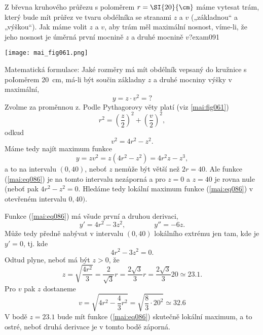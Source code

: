 \begin{mathexam}{Z břevna kruhového průřezu s poloměrem \(r = \protect\SI{20}{\protect\cm}\) máme
  vytesat trám, který bude mít průřez ve tvaru obdélníka se stranami \(z\) a \(v\) („základnou“ a
  „výškou“). Jak máme volit \(z\) a \(v\), aby trám měl maximální nosnost, víme-li, že jeho nosnost
  je úměrná první mocnině \(z\) a druhé mocnině \(v\)?}{exam091}
   
  {\centering
    \captionsetup{type=figure}
    \texttt{[image: mai\_fig061.png]} 
    \label{mai:fig061}
  \par}
  
  Matematická formulace: Jaké rozměry má mít obdélník vepsaný do kružnice s poIoměrem \SI{20}{\cm},
  má-li být součin základny \(z\) a druhé mocniny výšky v maximální,
  \begin{equation*}
    y = z\cdot v^2 = ?
  \end{equation*}
  Zvolme za proměnnou z. Podle Pythagorovy věty platí (viz \ref{mai:fig061})
  \begin{equation*}
      r^2 = \left(\dfrac{z}{2}\right)^2 + \left(\dfrac{v}{2}\right)^2,
  \end{equation*}
  odkud 
  \begin{equation*}
      v^2 = 4r^2 - z^2.
  \end{equation*}
  Máme tedy najít maximum funkce
  \begin{equation}\label{mai:eq086}
      y = zv^2 = z(4r^2 - z^2) = 4r^2z - z^3,
  \end{equation}
  a to na intervalu \((0,40)\), neboť \(z\) nemůže být větší než \(2r = 40\). Ale funkce
  (\ref{mai:eq086}) je na tomto intervalu nezáporná a pro \(z = 0\) a \(z = 40\) je rovna nule
  (neboť pak \(4r^2 - z^2 = 0\). Hledáme tedy lokální maximum funkce (\ref{mai:eq086}) v otevřeném
  intervalu \(0,40)\). 

  Funkce (\ref{mai:eq086}) má všude první a druhou derivaci,
  \begin{equation*}
      y' = 4r^2 - 3z^2, \qquad\qquad y'' = -6z.
  \end{equation*}
  Může tedy předně nabývat v intervalu \((0, 40)\) lokálního extrému jen tam, kde je \(y'=0\), tj.
  kde
  \begin{equation*}
      4r^2 - 3z^2 = 0.
  \end{equation*}
  Odtud plyne, neboť má být \(z > 0\), že
  \begin{equation*}
      z = \sqrt{\dfrac{4r^2}{3}} = \dfrac{2}{\sqrt{3}}r = \dfrac{2\sqrt{3}}{3}r = 
          \dfrac{2\sqrt{3}}{3}20 \simeq \num{23.1}.
  \end{equation*}
  Pro \(v\) pak \(z\) dostaneme
  \begin{equation*}
      v = \sqrt{4r^2 - \dfrac{4}{3}r^2} = \sqrt{\frac{8}{3}\cdot20^2}\simeq\num{32.6}
  \end{equation*}
  V bodě \(z = \num{23.1}\) bude mít funkce (\ref{mai:eq086}) skutečně lokální maximum, a to ostré,
  neboť druhá derivace je v tomto bodě záporná.
\end{mathexam}